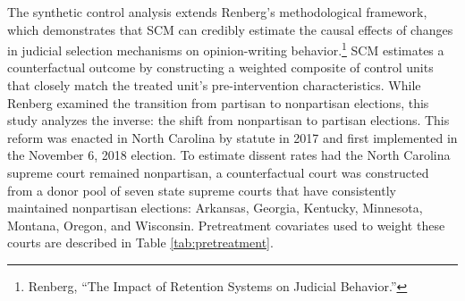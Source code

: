 The synthetic control analysis extends Renberg's methodological
framework, which demonstrates that SCM can credibly estimate the causal
effects of changes in judicial selection mechanisms on opinion-writing
behavior.\footnote{Renberg, {``The {Impact} of {Retention Systems} on
  {Judicial Behavior}.''}} SCM estimates a counterfactual outcome by
constructing a weighted composite of control units that closely match
the treated unit's pre-intervention characteristics. While Renberg
examined the transition from partisan to nonpartisan elections, this
study analyzes the inverse: the shift from nonpartisan to partisan
elections. This reform was enacted in North Carolina by statute in 2017
and first implemented in the November 6, 2018 election. To estimate
dissent rates had the North Carolina supreme court remained nonpartisan,
a counterfactual court was constructed from a donor pool of seven state
supreme courts that have consistently maintained nonpartisan elections:
Arkansas, Georgia, Kentucky, Minnesota, Montana, Oregon, and Wisconsin.
Pretreatment covariates used to weight these courts are described in
Table \ref{tab:pretreatment}.


